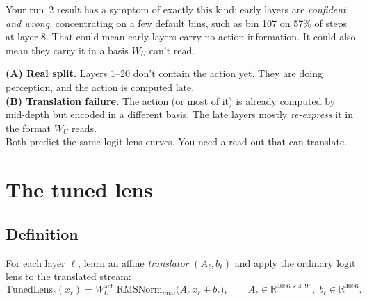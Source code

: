 \documentclass[11pt]{article}
\begin{document}
Your run~2 result has a symptom of exactly this kind: early layers are \emph{confident and wrong}, concentrating on a few default bins, such as bin 107 on 57\% of steps at layer 8. That could mean early layers carry no action information. It could also mean they carry it in a basis $W_U$ can't read.

\begin{mental}
\textbf{(A) Real split.} Layers 1--20 don't contain the action yet. They are doing perception, and the action is computed late.\\
\textbf{(B) Translation failure.} The action (or most of it) is already computed by mid-depth but encoded in a different basis. The late layers mostly \emph{re-express} it in the format $W_U$ reads.\\
Both predict the same logit-lens curves. You need a read-out that can translate.
\end{mental}

\section{The tuned lens}

\subsection{Definition}
For each layer $\ell$, learn an affine \emph{translator} $(A_\ell, b_\ell)$ and apply the ordinary logit lens to the translated stream:
\begin{equation}
\text{TunedLens}_\ell(x_\ell) = W_U^{\text{act}}\;\mathrm{RMSNorm}_{\text{final}}\big(A_\ell\, x_\ell + b_\ell\big),
\qquad A_\ell\in\mathbb{R}^{4096\times4096},\; b_\ell\in\mathbb{R}^{4096}.
\end{equation}
\end{document}

